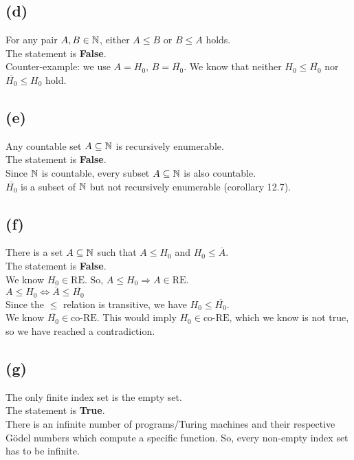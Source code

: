 \subsection{(d)}
For any pair $A,B\in\mathbb{N}$, either $A\leq B$ or $B\leq A$ holds.\vspace{0.3cm}\\
The statement is \textbf{False}.\\
Counter-example: we use $A=H_{0}$, $B=\overline{H_{0}}$. We know that neither $H_{0}\leq\overline{H_{0}}$ nor $\overline{H_{0}}\leq H_{0}$ hold.

\subsection{(e)}
Any countable set $A\subseteq\mathbb{N}$ is recursively enumerable.\vspace{0.3cm}\\
The statement is \textbf{False}.\\
Since $\mathbb{N}$ is countable, every subset $A\subseteq\mathbb{N}$ is also countable.\\
$\overline{H_{0}}$ is a subset of $\mathbb{N}$ but not recursively enumerable (corollary 12.7).

\subsection{(f)}
There is a set $A\subseteq\mathbb{N}$ such that $A\leq H_{0}$ and $H_{0}\leq \overline{A}$.\vspace{0.3cm}\\
The statement is \textbf{False}.\\
We know $H_{0} \in \text{RE}$. So, $A \leq H_{0} \Rightarrow A \in \text{RE}$.\\
$A\leq H_{0} \Leftrightarrow \overline{A}\leq\overline{H_{0}}$\\
Since the $\leq$ relation is transitive, we have $H_{0}\leq\overline{H_{0}}$.\\
We know $\overline{H_{0}} \in \text{co-RE}$. This would imply $H_{0} \in \text{co-RE}$, which we know is not true, so we have reached a contradiction.

\subsection{(g)}
The only finite index set is the empty set.\vspace{0.3cm}\\
The statement is \textbf{True}.\\
There is an infinite number of programs/Turing machines and their respective Gödel numbers which compute a specific function. So, every non-empty index set has to be infinite.

